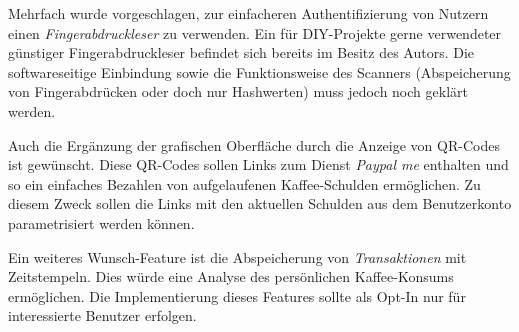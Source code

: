 \documentclass[11pt,a4paper]{IEEEtran}
\begin{document}
Mehrfach wurde vorgeschlagen, zur einfacheren Authentifizierung von Nutzern
einen \emph{Fingerabdruckleser} zu verwenden. Ein für DIY-Projekte gerne 
verwendeter günstiger Fingerabdruckleser befindet sich bereits im Besitz des
Autors. Die softwareseitige Einbindung sowie die Funktionsweise des Scanners
(Abspeicherung von Fingerabdrücken oder doch nur Hashwerten) muss jedoch noch
geklärt werden.

Auch die Ergänzung der grafischen Oberfläche durch die Anzeige von QR-Codes
ist gewünscht. Diese QR-Codes sollen Links zum Dienst \emph{Paypal me}
enthalten und so ein einfaches Bezahlen von aufgelaufenen Kaffee-Schulden
ermöglichen. Zu diesem Zweck sollen die Links mit den aktuellen Schulden
aus dem Benutzerkonto parametrisiert werden können.

Ein weiteres Wunsch-Feature ist die Abspeicherung von \emph{Transaktionen} mit
Zeitstempeln. Dies würde eine Analyse des persönlichen Kaffee-Konsums
ermöglichen. Die Implementierung dieses Features sollte als Opt-In nur für
interessierte Benutzer erfolgen. 

\printbibliography
\end{document}
